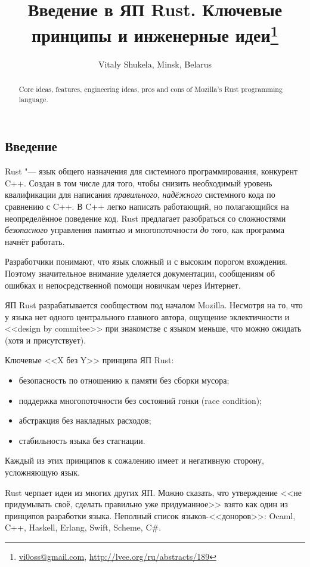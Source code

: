 \documentclass[10pt, a5paper]{article}
\begin{document}
\title{Введение в ЯП Rust. Ключевые принципы и инженерные идеи\footnote{\url{vi0oss@gmail.com}, \url{http://lvee.org/ru/abstracts/189}}}
\author{Vitaly Shukela, Minsk, Belarus}
\maketitle
\begin{abstract}
Core ideas, features, engineering ideas, pros and cons of Mozilla's Rust programming language.
\end{abstract}
\subsection*{Введение}

Rust "--- язык общего назначения для системного программирования, конкурент C++. Создан в том числе для того, чтобы снизить необходимый уровень квалификации для написания \emph{правильного}, \emph{надёжного} системного кода по сравнению с C++. В C++ легко написать работающий, но полагающийся на неопределённое поведение код. Rust предлагает разобраться со сложностями \emph{безопасного} управления памятью и
многопоточности \emph{до} того, как программа начнёт работать.

Разработчики понимают, что язык сложный и с высоким порогом вхождения. Поэтому значительное внимание уделяется документации, сообщениям об ошибках и непосредственной помощи новичкам через Интернет.

ЯП Rust разрабатывается сообществом под началом Mozilla. Несмотря на то, что у языка нет одного центрального главного автора, ощущение эклектичности и <<design by commitee>> при знакомстве с языком меньше, что можно ожидать (хотя и присутствует).

Ключевые <<X без Y>> принципа ЯП Rust:

\begin{itemize}
  \item безопасность по отношению к памяти без сборки мусора;
  \item поддержка многопоточности без состояний гонки (race condi\-tion);
  \item абстракция без накладных расходов;
  \item стабильность языка без стагнации.
\end{itemize}

Каждый из этих принципов к сожалению имеет и негативную сторону, усложняющую язык.

Rust черпает идеи из многих других ЯП. Можно сказать, что утверждение <<не придумывать своё, сделать правильно уже придуманное>> взято как один из принципов разработки языка. Неполный список языков-<<доноров>>: Ocaml, C++, Haskell, Erlang, Swift, Scheme, C\#.
\end{document}
